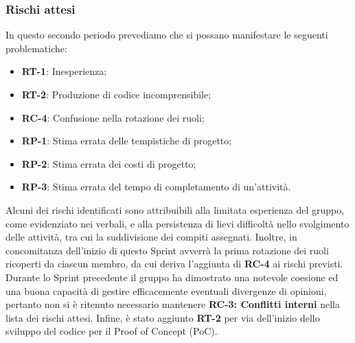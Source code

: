 \subsubsection{Rischi attesi}
In questo secondo periodo prevediamo che si possano manifestare le seguenti problematiche: 
\begin{itemize}
\setlength{\itemsep}{0}
\item \textbf{RT-1}: Inesperienza;
\item \textbf{RT-2}: Produzione di codice incomprensibile;
\item \textbf{RC-4}: Confusione nella rotazione dei ruoli;
\item \textbf{RP-1}: Stima errata delle tempistiche di progetto;
\item \textbf{RP-2}: Stima errata dei costi di progetto;
\item \textbf{RP-3}: Stima errata del tempo di completamento di un’attività.
\end{itemize}
Alcuni dei rischi identificati sono attribuibili alla limitata esperienza del gruppo, come evidenziato nei verbali, e alla persistenza di lievi difficoltà nello svolgimento delle attività, tra cui la suddivisione dei compiti assegnati. Inoltre, in concomitanza dell'inizio di questo Sprint avverrà la prima rotazione dei ruoli ricoperti da ciascun membro, da cui deriva l'aggiunta di \textbf{RC-4} ai rischi previsti. Durante lo Sprint precedente il gruppo ha dimostrato una notevole coesione ed una buona capacità di gestire efficacemente eventuali divergenze di opinioni, pertanto non si è ritenuto necessario mantenere \textbf{RC-3: Conflitti interni} nella lista dei rischi attesi. Infine, è stato aggiunto \textbf{RT-2} per via dell'inizio dello sviluppo del codice per il Proof of Concept (PoC).
\clearpage
